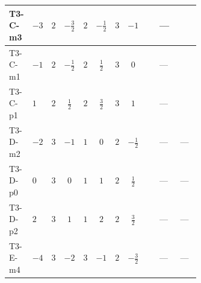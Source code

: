 \documentclass[8pt]{article}
\begin{document}
\begin{landscape}
\begin{longtable}{@{}llcccccc >{\raggedright\arraybackslash}p{0.21\linewidth} >{\raggedright\arraybackslash}p{0.21\linewidth} >{\raggedright\arraybackslash}p{0.21\linewidth}@{}}
\midrule
T3-C-m3 & $-3$ & $2$ & $-\frac{3}{2}$ & $2$ & $-\frac{1}{2}$ & $3$ & $-1$ & \scriptsize\adjustbox{max width=\linewidth}{$\begin{gathered} +4 {\lambda_{HS_1}^{(1)}} {\lambda_{HS_2}^{(1)}}\end{gathered}$} & --- & \scriptsize\adjustbox{max width=\linewidth}{$\begin{gathered} +\frac{9 {g_2}^4}{4}\end{gathered}$} \\
\midrule
T3-C-m1 & $-1$ & $2$ & $-\frac{1}{2}$ & $2$ & $\frac{1}{2}$ & $3$ & $0$ & \scriptsize\adjustbox{max width=\linewidth}{$\begin{gathered} +4 {\lambda_{HS_1}^{(1)}} {\lambda_{HS_2}^{(1)}}\end{gathered}$} & --- & \scriptsize\adjustbox{max width=\linewidth}{$\begin{gathered} +\frac{9 {g_2}^4}{4}\end{gathered}$} \\
\midrule
T3-C-p1 & $1$ & $2$ & $\frac{1}{2}$ & $2$ & $\frac{3}{2}$ & $3$ & $1$ & \scriptsize\adjustbox{max width=\linewidth}{$\begin{gathered} +4 {\lambda_{HS_1}^{(1)}} {\lambda_{HS_2}^{(1)}}\end{gathered}$} & --- & \scriptsize\adjustbox{max width=\linewidth}{$\begin{gathered} +\frac{9 {g_2}^4}{4}\end{gathered}$} \\
\midrule
T3-D-m2 & $-2$ & $3$ & $-1$ & $1$ & $0$ & $2$ & $-\frac{1}{2}$ & \scriptsize\adjustbox{max width=\linewidth}{$\begin{gathered} +4 {\lambda_{HS_1}^{(1)}} {\lambda_{HS_2}^{(1)}}\end{gathered}$} & --- & --- \\
\midrule
T3-D-p0 & $0$ & $3$ & $0$ & $1$ & $1$ & $2$ & $\frac{1}{2}$ & \scriptsize\adjustbox{max width=\linewidth}{$\begin{gathered} +4 {\lambda_{HS_1}^{(1)}} {\lambda_{HS_2}^{(1)}}\end{gathered}$} & --- & --- \\
\midrule
T3-D-p2 & $2$ & $3$ & $1$ & $1$ & $2$ & $2$ & $\frac{3}{2}$ & \scriptsize\adjustbox{max width=\linewidth}{$\begin{gathered} +4 {\lambda_{HS_1}^{(1)}} {\lambda_{HS_2}^{(1)}}\end{gathered}$} & --- & --- \\
\midrule
T3-E-m4 & $-4$ & $3$ & $-2$ & $3$ & $-1$ & $2$ & $-\frac{3}{2}$ & \scriptsize\adjustbox{max width=\linewidth}{$\begin{gathered} +4 {\lambda_{HS_1}^{(1)}} {\lambda_{HS_2}^{(1)}}\end{gathered}$} & --- & --- \\

\end{longtable}
\end{landscape}
\end{document}

